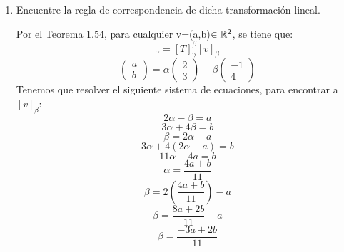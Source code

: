 \begin{enumerate}
    \item Encuentre la regla de correspondencia de dicha transformación lineal. 

    Por el Teorema $1.54$, para cualquier v=(a,b)$\in \mathbb{R}^2$, se tiene que:
    \begin{equation*}
        [T(v)]_\gamma = [T]_\gamma^\beta [v]_\beta
    \end{equation*}
    \begin{equation*}
        \begin{pmatrix}
            a\\
            b
        \end{pmatrix}
        =\alpha \begin{pmatrix}
            2\\
            3
        \end{pmatrix}
        + \beta 
        \begin{pmatrix}
            -1\\
            4
        \end{pmatrix}
    \end{equation*}
    Tenemos que resolver el siguiente sistema de ecuaciones, para encontrar a $[v]_\beta$:
    \begin{equation*}
        2\alpha-\beta=a
    \end{equation*}
    \begin{equation*}
        3\alpha+4\beta=b
    \end{equation*}
    \begin{equation*}
        \beta=2\alpha - a
    \end{equation*}
    \begin{equation*}
        3\alpha+4(2\alpha - a)=b
    \end{equation*}
    \begin{equation*}
        11\alpha - 4a=b
    \end{equation*}
    \begin{equation*}
        \alpha=\frac{4a+b}{11}
    \end{equation*}
    \begin{equation*}
        \beta=2(\frac{4a+b}{11}) - a
    \end{equation*}
    \begin{equation*}
        \beta=\frac{8a+2b}{11}-a
    \end{equation*}
    \begin{equation*}
        \beta=\frac{-3a+2b}{11}
    \end{equation*}


\end{enumerate}
